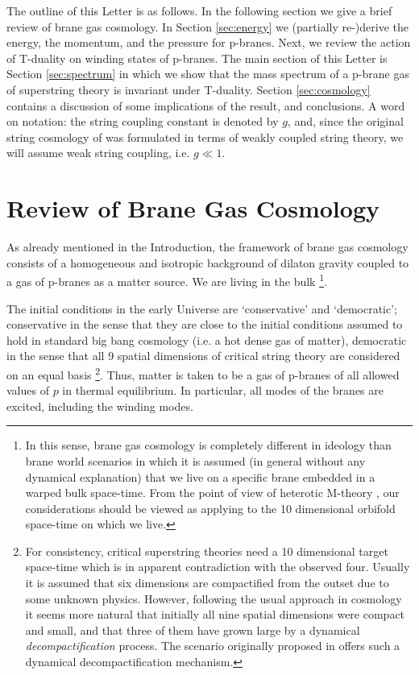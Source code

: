 \documentclass[a4paper,twocolumn,nofootinbib,tightenlines,prd,aps,
               superscriptaddress]{revtex4} %
\begin{document}
The outline of this Letter is as follows. In the following section
we give a brief review of brane gas cosmology. In Section
\ref{sec:energy} we (partially re-)derive the energy, the
momentum, and the pressure for  p-branes.
Next, we review the action of T-duality on winding states of
p-branes. The main section of this Letter is Section
\ref{sec:spectrum} in which we show that the mass spectrum of a
p-brane gas of superstring theory is invariant under T-duality.
Section \ref{sec:cosmology} contains a discussion of some
implications of the result, and conclusions. A word on notation:
the string coupling constant is denoted by $g$, and, since the
original string cosmology of \cite{Brandenberger:1989aj} was
formulated in terms of weakly coupled string theory, we will
assume weak string coupling, i.e. $g \ll 1$.


\section{Review of Brane Gas Cosmology}
\label{sec:review}

As already mentioned in the Introduction, the framework of brane
gas cosmology consists of a homogeneous and isotropic background
of dilaton gravity coupled to a gas of p-branes as a matter
source. We are living in the bulk \footnote{In this sense, brane
gas cosmology is completely different in ideology than brane world
scenarios in which it is assumed (in general without any dynamical
explanation) that we live on a specific brane embedded in a warped
bulk space-time. From the point of view of heterotic M-theory
\cite{Horava:1996qa}, our considerations should be viewed as
applying to the 10 dimensional orbifold space-time on which we
live.}.

The initial conditions in the early Universe are `conservative'
and `democratic'; conservative in the sense that they are close to
the initial conditions assumed to hold in standard big bang
cosmology (i.e. a hot dense gas of matter), democratic in the
sense that all 9 spatial dimensions of critical string theory are
considered on an equal basis \footnote{For consistency, critical
superstring theories need a 10 dimensional target space-time which
is in apparent contradiction with the observed four. Usually it is
assumed that six dimensions are compactified from the outset due
to some unknown physics. However, following the usual approach in
cosmology it seems more natural that initially all nine spatial
dimensions were compact and small, and that three of them have
grown large by a dynamical {\em decompactification} process. The
scenario originally proposed in \cite{Brandenberger:1989aj} offers
such a dynamical decompactification mechanism.}. Thus, matter is
taken to be a gas of p-branes of all allowed values of $p$ in
thermal equilibrium. In par\-ti\-cu\-lar, all modes of the branes
are excited, including the winding modes.
\end{document}
